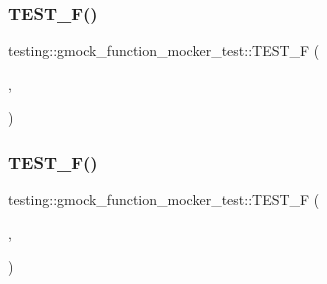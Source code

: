 \subsubsection{\texorpdfstring{TEST\_F()}{TEST\_F()}\hspace{0.1cm}{\footnotesize\ttfamily [9/13]}}
{\footnotesize\ttfamily testing\+::gmock\+\_\+function\+\_\+mocker\+\_\+test\+::\+T\+E\+S\+T\+\_\+F (\begin{DoxyParamCaption}\item[{\mbox{\hyperlink{classtesting_1_1gmock__function__mocker__test_1_1_mock_method_function_mocker_test}{Mock\+Method\+Function\+Mocker\+Test}}}]{,  }\item[{Mocks\+Functions\+Overloaded\+On\+Argument\+Number}]{ }\end{DoxyParamCaption})}

\mbox{\label{namespacetesting_1_1gmock__function__mocker__test_a0da05f5bda501f5b86249eddc2f1d4b0}} 
\subsubsection{\texorpdfstring{TEST\_F()}{TEST\_F()}\hspace{0.1cm}{\footnotesize\ttfamily [10/13]}}
{\footnotesize\ttfamily testing\+::gmock\+\_\+function\+\_\+mocker\+\_\+test\+::\+T\+E\+S\+T\+\_\+F (\begin{DoxyParamCaption}\item[{\mbox{\hyperlink{classtesting_1_1gmock__function__mocker__test_1_1_mock_method_function_mocker_test}{Mock\+Method\+Function\+Mocker\+Test}}}]{,  }\item[{Mocks\+Functions\+Overloaded\+On\+Argument\+Type}]{ }\end{DoxyParamCaption})}

\mbox{\label{namespacetesting_1_1gmock__function__mocker__test_a25b8c84174c3773f52bba3f15f3bb180}} 
